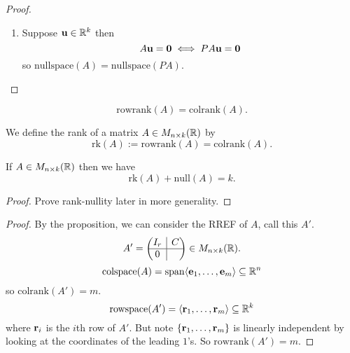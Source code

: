 \documentclass[10pt, a4paper]{article}
\begin{document}
\begin{proposition}
\begin{proof}
\begin{enumerate}[label = (\roman*)]
            Proof (claim)

            $\{P\mbf{v}_1, \dotsc, P\mbf{v}_r\}$ is certainly linearly independent
            (by last lemma).
            If $\mbf{v} \in PU$ then $\mbf{v} = P\mbf{u}$ for some $\mbf{u} + \lambda_1\mbf{v}_1 + \dotsi + \lambda_r\mbf{v}_r \in U$ so $\mbf{v} = P(\lambda_1\mbf{v}_1 + \dotsi + \lambda_r\mbf{v}_r) = \lambda_1P\mbf{v}_1 + \dotsi + \lambda_rP\mbf{v}_r$.
            So spanning.

            \item Suppose $\mathbf{u} \in \mathbb{R} ^ k$ then
            \[
            A\mathbf{u} = \mathbf{0} \iff PA\mathbf{u} = \mathbf{0}
            \]
            so $\mathrm{nullspace}(A) = \mathrm{nullspace}(PA)$.
        \end{enumerate}
    \end{proof}
\end{proposition}

\begin{theorem}[Rank Theorem, label = thm:rankthm]\label{linalg_thm_rankthm}
    \[
    \mathrm{rowrank}(A) = \mathrm{colrank}(A).
    \]
\end{theorem}

\begin{definition}[Rank]
    We define the rank of a matrix $A \in M_{n \times k}(\mathbb{R})$ by
    \[
    \mathrm{rk}(A) := \mathrm{rowrank}(A) = \mathrm{colrank}(A).
    \]
\end{definition}

\begin{theorem}
    If $A \in M_{n \times k}(\mathbb{R})$ then we have
    \[
    \mathrm{rk}(A) + \mathrm{null}(A) = k.
    \]
    \begin{proof}
        Prove rank-nullity later in more generality.
    \end{proof}
\end{theorem}

\begin{theorem}[continues = thm:rankthm]
    \begin{proof}
        By the proposition,
        we can consider the RREF of $A$,
        call this $A'$.
        \[
        A' = \left(\hspace{-5pt}
        \begin{array}{c|c}
            I_r & C \\
            \hline
            0
        \end{array}
        \hspace{-5pt}\right) \in M_{n \times k}(\mathbb{R}).
        \]
        \[
        \mathrm{colspace}(A) = \mathrm{span}\langle\mathbf{e}_1, \dotsc, \mathbf{e}_m\rangle \subseteq \mathbb{R} ^ n
        \]
        so $\mathrm{colrank}(A') = m$.
        \[
        \mathrm{rowspace}(A') = \langle\mathbf{r}_1, \dotsc, \mathbf{r}_m\rangle \subseteq \mathbb{R} ^ k
        \]
        where $\mathbf{r}_i$ is the $i$th row of $A'$.
        But note $\{\mathbf{r}_1, \dotsc, \mathbf{r}_m\}$ is linearly independent by looking at the coordinates of the leading $1$'s.
        So $\mathrm{rowrank}(A') = m$.
    \end{proof}
\end{theorem}
\end{document}
